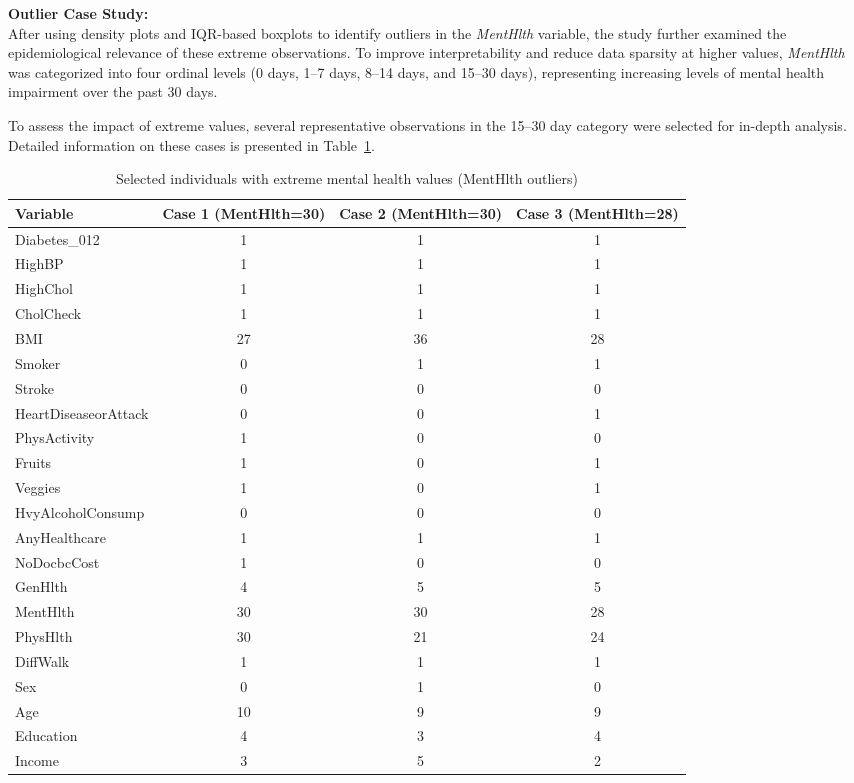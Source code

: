 \textbf{Outlier Case Study:} \\
After using density plots and IQR-based boxplots to identify outliers in the \textit{MentHlth} variable, the study further examined the epidemiological relevance of these extreme observations. To improve interpretability and reduce data sparsity at higher values, \textit{MentHlth} was categorized into four ordinal levels (0 days, 1--7 days, 8--14 days, and 15--30 days), representing increasing levels of mental health impairment over the past 30 days.

To assess the impact of extreme values, several representative observations in the 15–30 day category were selected for in-depth analysis. Detailed information on these cases is presented in Table~\ref{tab:menthlth_cases}.

\begin{table}[H]
\centering
\caption{Selected individuals with extreme mental health values (MentHlth outliers)}
\label{tab:menthlth_cases}

\scriptsize
\setlength{\tabcolsep}{4pt}
\renewcommand{\arraystretch}{1.1}

\begin{tabular}{l|c|c|c}
\hline
\textbf{Variable} & \textbf{Case 1 (MentHlth=30)} & \textbf{Case 2 (MentHlth=30)} & \textbf{Case 3 (MentHlth=28)} \\
\hline
Diabetes\_012 & 1 & 1 & 1 \\
HighBP & 1 & 1 & 1 \\
HighChol & 1 & 1 & 1 \\
CholCheck & 1 & 1 & 1 \\
BMI & 27 & 36 & 28 \\
Smoker & 0 & 1 & 1 \\
Stroke & 0 & 0 & 0 \\
HeartDiseaseorAttack & 0 & 0 & 1 \\
PhysActivity & 1 & 0 & 0 \\
Fruits & 1 & 0 & 1 \\
Veggies & 1 & 0 & 1 \\
HvyAlcoholConsump & 0 & 0 & 0 \\
AnyHealthcare & 1 & 1 & 1 \\
NoDocbcCost & 1 & 0 & 0 \\
GenHlth & 4 & 5 & 5 \\
MentHlth & 30 & 30 & 28 \\
PhysHlth & 30 & 21 & 24 \\
DiffWalk & 1 & 1 & 1 \\
Sex & 0 & 1 & 0 \\
Age & 10 & 9 & 9 \\
Education & 4 & 3 & 4 \\
Income & 3 & 5 & 2 \\
\hline
\end{tabular}
\end{table}


